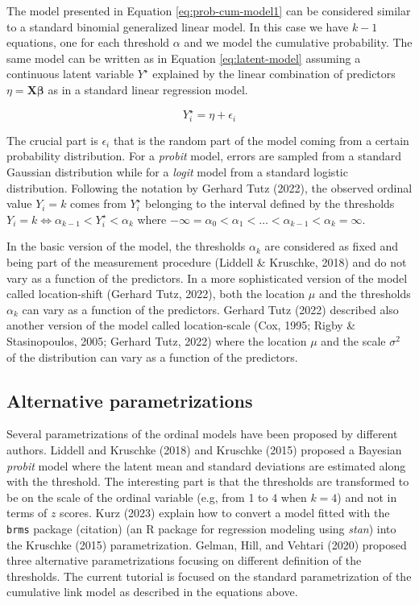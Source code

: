 \documentclass[
  man,floatsintext]{apa6}
\begin{document}
\normalsize

The model presented in Equation \eqref{eq:prob-cum-model1} can be considered similar to a standard binomial generalized linear model. In this case we have \(k - 1\) equations, one for each threshold \(\alpha\) and we model the cumulative probability. The same model can be written as in Equation \eqref{eq:latent-model} assuming a continuous latent variable \(Y^\star\) explained by the linear combination of predictors \(\eta = \mathbf{X} \boldsymbol{\beta}\) as in a standard linear regression model.

\begin{equation} 
Y^\star_i = \eta + \epsilon_i
\label{eq:latent-model}
\end{equation}

The crucial part is \(\epsilon_i\) that is the random part of the model coming from a certain probability distribution. For a \emph{probit} model, errors are sampled from a standard Gaussian distribution while for a \emph{logit} model from a standard logistic distribution. Following the notation by Gerhard Tutz (2022), the observed ordinal value \(Y_i = k\) comes from \(Y^\star_i\) belonging to the interval defined by the thresholds \(Y_i = k \iff \alpha_{k - 1} < Y^\star_i < \alpha_{k}\) where \(- \infty = \alpha_0 < \alpha_1 < \dots< \alpha_{k - 1} < \alpha_k = \infty\).

In the basic version of the model, the thresholds \(\alpha_k\) are considered as fixed and being part of the measurement procedure (Liddell \& Kruschke, 2018) and do not vary as a function of the predictors. In a more sophisticated version of the model called location-shift (Gerhard Tutz, 2022), both the location \(\mu\) and the thresholds \(\alpha_k\) can vary as a function of the predictors. Gerhard Tutz (2022) described also another version of the model called location-scale (Cox, 1995; Rigby \& Stasinopoulos, 2005; Gerhard Tutz, 2022) where the location \(\mu\) and the scale \(\sigma^2\) of the distribution can vary as a function of the predictors.

\subsection{Alternative parametrizations}\label{alternative-parametrizations}

Several parametrizations of the ordinal models have been proposed by different authors. Liddell and Kruschke (2018) and Kruschke (2015) proposed a Bayesian \emph{probit} model where the latent mean and standard deviations are estimated along with the threshold. The interesting part is that the thresholds are transformed to be on the scale of the ordinal variable (e.g, from 1 to 4 when \(k = 4\)) and not in terms of \(z\) scores. Kurz (2023) explain how to convert a model fitted with the \texttt{brms} package (citation) (an R package for regression modeling using \emph{stan}) into the Kruschke (2015) parametrization. Gelman, Hill, and Vehtari (2020) proposed three alternative parametrizations focusing on different definition of the thresholds. The current tutorial is focused on the standard parametrization of the cumulative link model as described in the equations above.
\end{document}
